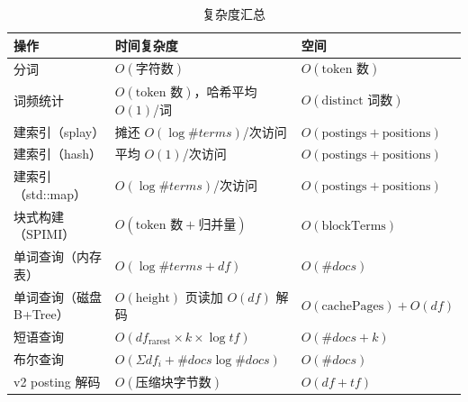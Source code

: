 \begin{table}[htbp]
  \centering
  \caption{复杂度汇总}
  \label{tab:complexity}
  \small
  \begin{tabularx}{\linewidth}{@{}l X X@{}}
    \toprule
    操作 & 时间复杂度 & 空间 \\
    \midrule
    分词 & $O(\text{字符数})$ & $O(\text{token 数})$ \\
    词频统计 & $O(\text{token 数})$，哈希平均 $O(1)$/词 & $O(\text{distinct 词数})$ \\
    建索引（splay） & 摊还 $O(\log \#terms)$/次访问 & $O(\text{postings} + \text{positions})$ \\
    建索引（hash） & 平均 $O(1)$/次访问 & $O(\text{postings} + \text{positions})$ \\
    建索引（std::map） & $O(\log \#terms)$/次访问 & $O(\text{postings} + \text{positions})$ \\
    块式构建（SPIMI） & $O(\text{token 数} + \text{归并量})$ & $O(\text{blockTerms})$ \\
    单词查询（内存表） & $O(\log \#terms + df)$ & $O(\#docs)$ \\
    单词查询（磁盘 B+Tree） & $O(\text{height})$ 页读加 $O(df)$ 解码 & $O(\text{cachePages}) + O(df)$ \\
    短语查询 & $O(df_{\text{rarest}} \times k \times \log tf)$ & $O(\#docs + k)$ \\
    布尔查询 & $O(\Sigma df_i + \#docs \log \#docs)$ & $O(\#docs)$ \\
    v2 posting 解码 & $O(\text{压缩块字节数})$ & $O(df + tf)$ \\
    \bottomrule
  \end{tabularx}
\end{table}
